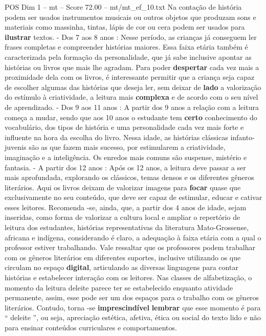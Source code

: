 \begin{textsample}{POS Dim 1 – mt – Score 72.00 – mt/mt\_ef\_10.txt}
Na contação de história podem ser usados instrumentos musicais ou outros objetos que produzam sons e materiais como massinha, tintas, lápis de cor ou cera podem ser usados para \textbf{ilustrar} textos. - Dos 7 aos 8 anos : Nesse período, as crianças já conseguem ler frases completas e compreender histórias maiores.
Essa faixa etária também é caracterizada pela formação da personalidade, que já sabe inclusive apontar as histórias ou livros que mais lhe agradam.
Para poder \textbf{despertar} cada vez mais a proximidade dela com os livros, é interessante permitir que a criança seja capaz de escolher algumas das histórias que deseja ler, sem deixar de \textbf{lado} a valorização do estímulo à criatividade, a leitura mais \textbf{complexa} e de acordo com o seu nível de aprendizado. - Dos 9 aos 11 anos : A partir dos 9 anos a relação com a leitura começa a mudar, sendo que aos 10 anos o estudante tem \textbf{certo} conhecimento do vocabulário, dos tipos de história e uma personalidade cada vez mais forte e influente na hora da escolha do livro.
Nessa idade, as histórias clássicas infanto-juvenis são as que fazem mais sucesso, por estimularem a criatividade, imaginação e a inteligência.
Os enredos mais comuns são suspense, mistério e fantasia. - A partir dos 12 anos : Após os 12 anos, a leitura deve passar a ser mais aprofundada, explorando os clássicos, temas densos e os diferentes gêneros literários.
Aqui os livros deixam de valorizar imagens para \textbf{focar} quase que exclusivamente no seu conteúdo, que deve ser capaz de estimular, educar e cativar esses leitores.
Recomenda -se, ainda, que, a partir dos 4 anos de idade, sejam inseridas, como forma de valorizar a cultura local e ampliar o repertório de leitura dos estudantes, histórias representativas da literatura Mato-Grossense, africana e indígena, considerando é claro, a adequação à faixa etária com a qual o professor estiver trabalhando.
Vale ressaltar que os professores podem trabalhar com os gêneros literários em diferentes suportes, inclusive utilizando os que circulam no espaço \textbf{digital}, articulando as diversas linguagens para contar histórias e estabelecer interação com os leitores.
Nas classes de alfabetização, o momento da leitura deleite parece ter se estabelecido enquanto atividade permanente, assim, esse pode ser um dos espaços para o trabalho com os gêneros literários.
Contudo, torna -se \textbf{imprescindível} \textbf{lembrar} que esse momento é para “ deleite ”, ou seja, apreciação estética, afetiva, ética ou social do texto lido e não para ensinar conteúdos curriculares e comportamentos.

\end{textsample}
